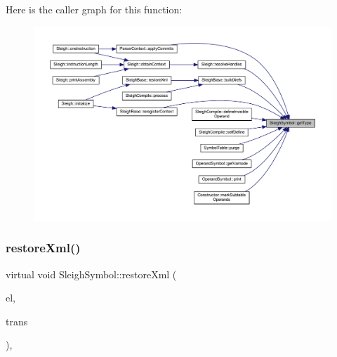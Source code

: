 Here is the caller graph for this function\+:
\nopagebreak
\begin{figure}[H]
\begin{center}
\leavevmode
\includegraphics[width=350pt]{class_sleigh_symbol_a2f6e5903e461084c29f95ea024883950_icgraph}
\end{center}
\end{figure}
\mbox{\label{class_sleigh_symbol_accaec1696f99366fb0e089a7fceb56a3}} 
\subsubsection{\texorpdfstring{restoreXml()}{restoreXml()}}
{\footnotesize\ttfamily virtual void Sleigh\+Symbol\+::restore\+Xml (\begin{DoxyParamCaption}\item[{const \mbox{\hyperlink{class_element}{Element}} $\ast$}]{el,  }\item[{\mbox{\hyperlink{class_sleigh_base}{Sleigh\+Base}} $\ast$}]{trans }\end{DoxyParamCaption})\hspace{0.3cm}{\ttfamily [inline]}, {\ttfamily [virtual]}}



